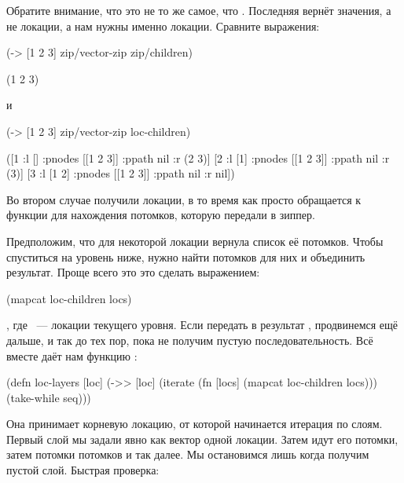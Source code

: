 Обратите внимание, что это не то же самое, что . Последняя вернёт
значения, а не локации, а нам нужны именно локации. Сравните выражения:

\begin{english}
  \begin{clojure}
(-> [1 2 3]
    zip/vector-zip
    zip/children)

(1 2 3)
  \end{clojure}
\end{english}

\noindent
и

\begin{english}
  \begin{clojure}
(-> [1 2 3]
    zip/vector-zip
    loc-children)

([1 {:l [] :pnodes [[1 2 3]] :ppath nil :r (2 3)}]
 [2 {:l [1] :pnodes [[1 2 3]] :ppath nil :r (3)}]
 [3 {:l [1 2] :pnodes [[1 2 3]] :ppath nil :r nil}])
  \end{clojure}
\end{english}

Во втором случае получили локации, в то время как  просто
обращается к функции для нахождения потомков, которую передали в зиппер.

Предположим, что для некоторой локации  вернула список её
потомков. Чтобы спуститься на уровень ниже, нужно найти потомков для них и
объединить результат. Проще всего это это сделать выражением:

\begin{english}
  \begin{clojure}
(mapcat loc-children locs)
  \end{clojure}
\end{english}

\noindent
, где ~--- локации текущего уровня. Если передать в  результат
, продвинемся ещё дальше, и так до тех пор, пока не получим пустую
последовательность. Всё вместе даёт нам функцию :

\begin{english}
  \begin{clojure}
(defn loc-layers [loc]
  (->> [loc]
       (iterate (fn [locs]
                  (mapcat loc-children locs)))
       (take-while seq)))
  \end{clojure}
\end{english}

Она принимает корневую локацию, от которой начинается итерация по слоям. Первый
слой мы задали явно как вектор одной локации. Затем идут его потомки, затем
потомки потомков и так далее. Мы остановимся лишь когда получим пустой
слой. Быстрая проверка:

